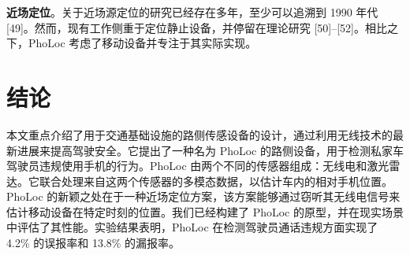 \documentclass[journal, onecolumn]{IEEEtran}
\begin{document}
\textbf{近场定位}。关于近场源定位的研究已经存在多年，至少可以追溯到 1990 年代 [49]。然而，现有工作侧重于定位静止设备，并停留在理论研究 [50]–[52]。相比之下，PhoLoc 考虑了移动设备并专注于其实际实现。

\section{结论}

本文重点介绍了用于交通基础设施的路侧传感设备的设计，通过利用无线技术的最新进展来提高驾驶安全。它提出了一种名为 PhoLoc 的路侧设备，用于检测私家车驾驶员违规使用手机的行为。PhoLoc 由两个不同的传感器组成：无线电和激光雷达。它联合处理来自这两个传感器的多模态数据，以估计车内的相对手机位置。PhoLoc 的新颖之处在于一种近场定位方案，该方案能够通过窃听其无线电信号来估计移动设备在特定时刻的位置。我们已经构建了 PhoLoc 的原型，并在现实场景中评估了其性能。实验结果表明，PhoLoc 在检测驾驶员通话违规方面实现了 4.2\% 的误报率和 13.8\% 的漏报率。
\end{document}
